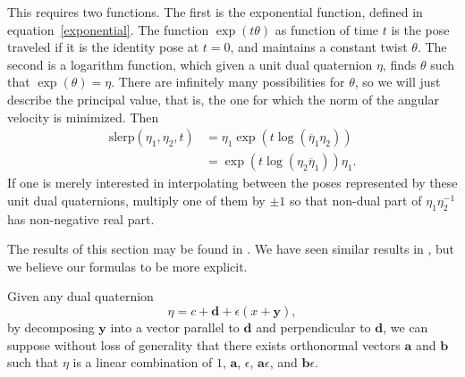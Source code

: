 \documentclass[reqno,12pt]{amsart}
\begin{document}
This requires two functions.  The first is the exponential function, defined in equation~\eqref{exponential}.  The function $\exp(t \theta)$ as function of time $t$ is the pose traveled if it is the identity pose at $t = 0$, and maintains a constant twist $\theta$.  The second is a logarithm function, which given a unit dual quaternion $\eta$, finds $\theta$ such that $\exp(\theta) = \eta$.  There are infinitely many possibilities for $\theta$, so we will just describe the principal value, that is, the one for which the norm of the angular velocity is minimized.  Then
\begin{equation}
\begin{aligned}
\text{slerp}(\eta_1, \eta_2, t) &= \eta_1 \exp(t \log(\overline\eta_1 \eta_2)) \\
&= \exp(t \log(\eta_2 \overline\eta_1)) \eta_1 .
\end{aligned}
\end{equation}
If one is merely interested in interpolating between the poses represented by these unit dual quaternions, multiply one of them by $\pm 1$ so that non-dual part of $\eta_1 \eta_2^{-1}$ has non-negative real part.

The results of this section may be found in \cite{montgomery-smith}.  We have seen similar results in \cite{wang-et-al}, but we believe our formulas to be more explicit.

Given any dual quaternion
\begin{equation}
\eta = c + \bm d + \epsilon (x + \bm y),
\end{equation}
by decomposing $\bm y$ into a vector parallel to $\bm d$ and perpendicular to $\bm d$, we can suppose without loss of generality that there exists orthonormal vectors $\bm a$ and $\bm b$ such that $\eta$ is a linear combination of $1$, $\bm a$, $\epsilon$, $\bm a \epsilon$, and $\bm b \epsilon$.
\end{document}
